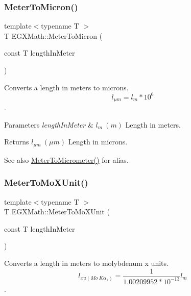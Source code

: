 \subsubsection{\texorpdfstring{Meter\+To\+Micron()}{MeterToMicron()}}
{\footnotesize\ttfamily template$<$typename T $>$ \\
T E\+G\+X\+Math\+::\+Meter\+To\+Micron (\begin{DoxyParamCaption}\item[{const T}]{length\+In\+Meter }\end{DoxyParamCaption})}



Converts a length in meters to microns. \[ l_{\mu m}=l_{m} * 10^{6} \]. 


\begin{DoxyParams}{Parameters}
{\em length\+In\+Meter} & $ l_{m}\ (m)$ Length in meters. \\
\hline
\end{DoxyParams}
\begin{DoxyReturn}{Returns}
$ l_{\mu m}\ (\mu m)$ Length in microns. 
\end{DoxyReturn}
\begin{DoxySeeAlso}{See also}
\mbox{\hyperlink{group___e_g_x_math-_conversions-_length_conversions-_s_i-_meter-_s_i_gac0114c26af780ce603948df83f5e338e}{Meter\+To\+Micrometer()}} for alias. 
\end{DoxySeeAlso}
\mbox{\label{group___e_g_x_math-_conversions-_length_conversions-_s_i-_meter-_non-_s_i_gae0351200a3d90c4efe741c6057b2fd4b}} 
\subsubsection{\texorpdfstring{Meter\+To\+Mo\+X\+Unit()}{MeterToMoXUnit()}}
{\footnotesize\ttfamily template$<$typename T $>$ \\
T E\+G\+X\+Math\+::\+Meter\+To\+Mo\+X\+Unit (\begin{DoxyParamCaption}\item[{const T}]{length\+In\+Meter }\end{DoxyParamCaption})}



Converts a length in meters to molybdenum x units. \[ l_{xu(Mo\ K\alpha_1)}=\frac{1}{1.00209952*10^{-13}} l_{m} \]. 


